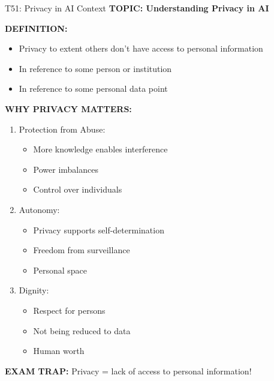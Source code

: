 \documentclass[8pt]{beamer}
\begin{document}
	\begin{frame}{T51: Privacy in AI Context}
		\fontsize{6.5}{7.5}\selectfont
		\textbf{TOPIC: Understanding Privacy in AI}
		
		\vspace{0.1cm}
		\textbf{DEFINITION:}
		\begin{itemize}
			\item Privacy to extent others don't have access to personal information
			\item In reference to some person or institution
			\item In reference to some personal data point
		\end{itemize}
		
		\vspace{0.1cm}
		\textbf{WHY PRIVACY MATTERS:}
		\begin{enumerate}
			\item \textcolor{myblue}{Protection from Abuse:}
			\begin{itemize}
				\item More knowledge enables interference
				\item Power imbalances
				\item Control over individuals
			\end{itemize}
			\item \textcolor{myblue}{Autonomy:}
			\begin{itemize}
				\item Privacy supports self-determination
				\item Freedom from surveillance
				\item Personal space
			\end{itemize}
			\item \textcolor{myblue}{Dignity:}
			\begin{itemize}
				\item Respect for persons
				\item Not being reduced to data
				\item Human worth
			\end{itemize}
		\end{enumerate}
		
		\textcolor{myred}{\textbf{EXAM TRAP:}} Privacy = \textcolor{myblue}{lack of access to personal information}!
	\end{frame}
	
\end{document}
